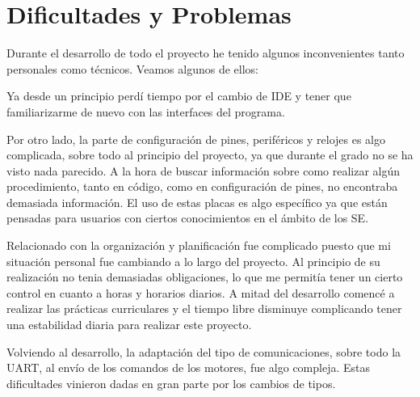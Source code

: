 \section{Dificultades y Problemas}\label{sec:ARDificultades}
Durante el desarrollo de todo el proyecto he tenido algunos inconvenientes tanto personales como técnicos. Veamos algunos de ellos:
\begin{description}
\item Ya desde un principio perdí tiempo por el cambio de IDE y tener que familiarizarme de nuevo con las interfaces del programa. 
\item Por otro lado, la parte de configuración de pines, periféricos y relojes es algo complicada, sobre todo al principio del proyecto, ya que durante el grado no se ha visto nada parecido. A la hora de buscar información sobre como realizar algún procedimiento, tanto en código, como en configuración de pines, no encontraba demasiada información. El uso de estas placas es algo específico ya que están pensadas para usuarios con ciertos conocimientos en el ámbito de los SE. 
\item Relacionado con la organización y planificación fue complicado puesto que mi situación personal fue cambiando a lo largo del proyecto. Al principio de su realización no tenia demasiadas obligaciones, lo que me permitía tener un cierto control en cuanto a horas y horarios diarios. A mitad del desarrollo comencé a realizar las prácticas curriculares y el tiempo libre disminuye complicando tener una estabilidad diaria para realizar este proyecto.
\item Volviendo al desarrollo, la adaptación del tipo de comunicaciones, sobre todo la UART, al envío de los comandos de los motores, fue algo compleja. Estas dificultades vinieron dadas en gran parte por los cambios de tipos.
\end{description}

